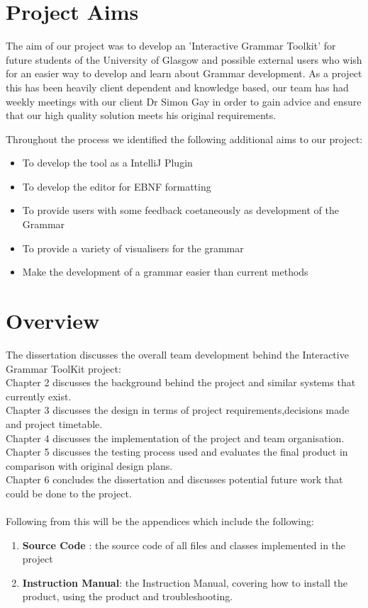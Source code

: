 \documentclass{l3proj}
\begin{document}
\section{Project Aims}
The aim of our project was to develop an 'Interactive Grammar Toolkit' for future students of the University of Glasgow and possible external users who wish for an easier way to develop and learn about Grammar development. As a project this has been heavily client dependent and knowledge based, our team has had weekly meetings with our client Dr Simon Gay in order to gain advice and ensure that our high quality solution meets his original requirements. 

Throughout the process we identified the following additional aims to our project:
\begin {itemize}
	\item To develop the tool as a IntelliJ Plugin
	\item To develop the editor for EBNF formatting
	\item To provide users with some feedback coetaneously as development of the Grammar
	\item To provide a variety of visualisers for the grammar
	\item Make the development of a grammar easier than current methods
\end{itemize}
 
\section{Overview}
The dissertation discusses the overall team development behind the Interactive Grammar ToolKit project:\\

Chapter 2 discusses the background behind the project and similar systems that currently exist.\\
Chapter 3 discusses the design in terms of project requirements,decisions made and project timetable.\\ 
Chapter 4 discusses the implementation of the project and team organisation.\\
Chapter 5 discusses the testing process used and evaluates the final product in comparison with original design plans.\\
Chapter 6 concludes the dissertation and discusses potential future work that could be done to the project.\\
\\
Following from this will be the appendices which include the following:
\begin {enumerate}
	\item \textbf{Source Code} : the source code of all files and classes implemented in the project
	\item \textbf{Instruction Manual}: the Instruction Manual, covering how to install the product, using the product and troubleshooting.
\end{enumerate}
\end{document}

